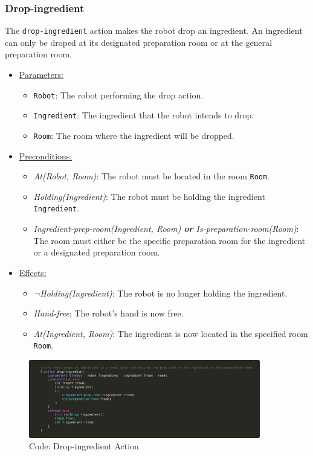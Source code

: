 \documentclass{article}
\begin{document}
\subsubsection{Drop-ingredient}
The \texttt{drop-ingredient} action makes the robot drop an ingredient. An ingredient can only be droped at its designated preparation room or at the general preparation room.
\begin{itemize}
    \item \underline{Parameters:}
    \begin{itemize}
        \item \texttt{Robot}: The robot performing the drop action.
        \item \texttt{Ingredient}: The ingredient that the robot intends to drop.
        \item \texttt{Room}: The room where the ingredient will be dropped.
    \end{itemize}
    \item \underline{Preconditions:}
    \begin{itemize}
        \item \textit{At(Robot, Room)}: The robot must be located in the room \texttt{Room}.
        \item \textit{Holding(Ingredient)}: The robot must be holding the ingredient \texttt{Ingredient}.
        \item \textit{Ingredient-prep-room(Ingredient, Room) \textbf{or} Is-preparation-room(Room)}: The room must either be the specific preparation room for the ingredient or a designated preparation room.
    \end{itemize}
    \item \underline{Effects:}
    \begin{itemize}
        \item \textit{¬Holding(Ingredient)}: The robot is no longer holding the ingredient.
        \item \textit{Hand-free}: The robot’s hand is now free.
        \item \textit{At(Ingredient, Room)}: The ingredient is now located in the specified room \texttt{Room}.
    \end{itemize}
\end{itemize}
    \begin{figure}[ht]
    \centering
    \includegraphics[width=0.90\textwidth]{assets/drop-ingredient.png}
    \caption{Code: Drop-ingredient Action}
    \label{fig:act:drop-ing}
\end{figure}
\end{document}

